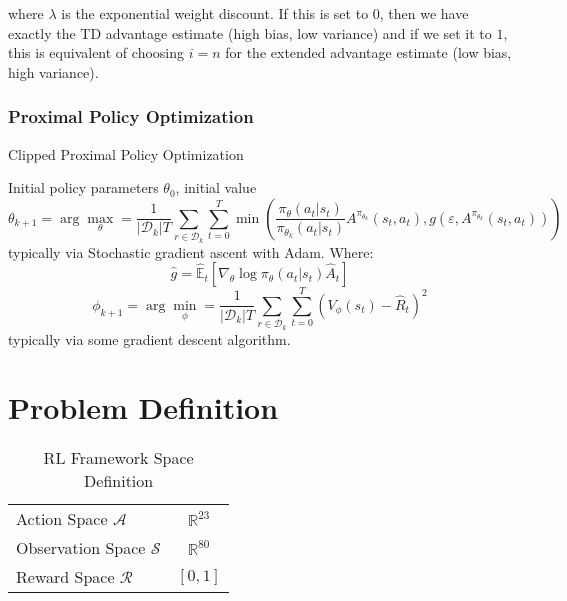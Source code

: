 where $\lambda$ is the exponential weight discount. If this is set to $0$, then we have exactly the TD advantage estimate (high bias, low variance) and if we set it to $1$, this is equivalent of choosing $i=n$ for the extended advantage estimate (low bias, high variance). 


\subsubsection{Proximal Policy Optimization}
\begin{algorithm}[H]
    \caption{Clipped Proximal Policy Optimization}
    \label{alg:ppo}
    \begin{algorithmic}[1]
    \REQUIRE Initial policy parameters $\theta _0$, initial value
    $$
\theta _{k + 1} = \arg\max _{\theta} = \frac{1}{|\mathcal{D} _k|T} \sum _{r \in \mathcal{D} _k} \sum _{t = 0} ^{T} \min \left( \frac{\pi _{\theta} (a _t | s _t)}{\pi _{\theta_k} (a _t | s _t)} A ^{\pi _{\theta_k}} (s _t, a _t), g(\varepsilon, A ^{\pi _{\theta_k}}(s _t, a _t)) \right)
    $$    
    typically via Stochastic gradient ascent with Adam. Where:
    $$
\hat{g} = \hat{\mathbb{E}} _t \left[\nabla _{\theta}\log\pi _{\theta}(a _t | s _t) \hat{A} _t\right]
$$
    $$
    \phi _{k + 1} = \arg\min _{\phi} = \frac{1}{|\mathcal{D} _k|T} \sum _{r \in \mathcal{D} _k} \sum _{t = 0} ^{T} \left(V _{\phi}(s _t) - \hat{R} _t \right)^2
$$
typically via some gradient descent algorithm.
    \ENDFOR 
    \end{algorithmic}
\end{algorithm} 

\section{Problem Definition}

\lipsum[1]

\begin{table}[]
    \centering
    \begin{tabular}{l c}
        Action Space $\mathcal{A}$ & $\mathbb{R} ^{23}$\\
        Observation Space $\mathcal{S}$ & $\mathbb{R} ^{80}$ \\
        Reward Space $\mathcal{R}$ & $[0,1]$
    \end{tabular}
    \caption{RL Framework Space Definition}
    \label{tab:spacedef}
\end{table}